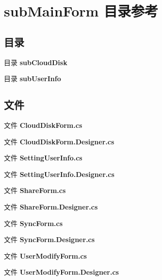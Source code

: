 \section{sub\+Main\+Form 目录参考}
\label{dir_fdf890fe7fe14a17071b6e240cc5d184}
\subsection*{目录}
\begin{DoxyCompactItemize}
\item 
目录 \textbf{ sub\+Cloud\+Disk}
\item 
目录 \textbf{ sub\+User\+Info}
\end{DoxyCompactItemize}
\subsection*{文件}
\begin{DoxyCompactItemize}
\item 
文件 \textbf{ Cloud\+Disk\+Form.\+cs}
\item 
文件 \textbf{ Cloud\+Disk\+Form.\+Designer.\+cs}
\item 
文件 \textbf{ Setting\+User\+Info.\+cs}
\item 
文件 \textbf{ Setting\+User\+Info.\+Designer.\+cs}
\item 
文件 \textbf{ Share\+Form.\+cs}
\item 
文件 \textbf{ Share\+Form.\+Designer.\+cs}
\item 
文件 \textbf{ Sync\+Form.\+cs}
\item 
文件 \textbf{ Sync\+Form.\+Designer.\+cs}
\item 
文件 \textbf{ User\+Modify\+Form.\+cs}
\item 
文件 \textbf{ User\+Modify\+Form.\+Designer.\+cs}
\end{DoxyCompactItemize}
